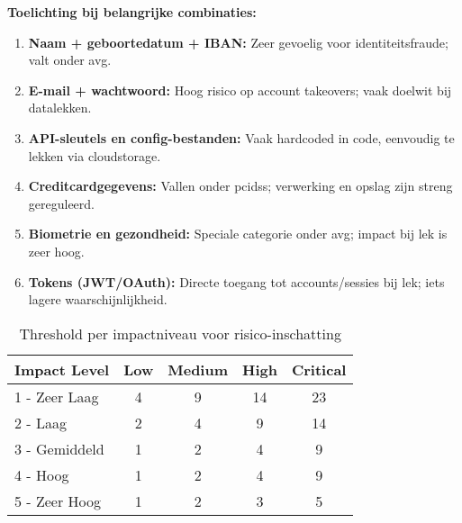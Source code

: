 \textbf{Toelichting bij belangrijke combinaties:}
\begin{enumerate}
    \item \textbf{Naam + geboortedatum + IBAN:} Zeer gevoelig voor identiteitsfraude; valt onder \gls{avg}.
    \item \textbf{E-mail + wachtwoord:} Hoog risico op account takeovers; vaak doelwit bij datalekken.
    \item \textbf{API-sleutels en config-bestanden:} Vaak hardcoded in code, eenvoudig te lekken via cloudstorage.
    \item \textbf{Creditcardgegevens:} Vallen onder \gls{pcidss}; verwerking en opslag zijn streng gereguleerd.
    \item \textbf{Biometrie en gezondheid:} Speciale categorie onder \gls{avg}; impact bij lek is zeer hoog.
    \item \textbf{Tokens (JWT/OAuth):} Directe toegang tot accounts/sessies bij lek; iets lagere waarschijnlijkheid.
\end{enumerate}






\begin{table}[h]
    \centering
    \small
    \scriptsize
    \begin{tabular}{l c c c c}
        \toprule
        \textbf{Impact Level} & \textbf{Low} & \textbf{Medium} & \textbf{High} & \textbf{Critical} \\
        \midrule
        1 - Zeer Laag     &  4   & 9   & 14  &  23 \\
        2 - Laag          &  2   & 4   & 9   &  14 \\
        3 - Gemiddeld     &  1   & 2   & 4   &  9 \\
        4 - Hoog          &  1   & 2   & 4   &  9 \\
        5 - Zeer Hoog     &  1   & 2   & 3   &  5 \\
        \bottomrule
    \end{tabular}
    \caption{Threshold per impactniveau voor risico-inschatting}
    \label{tab:risico_thresholds}
\end{table}


